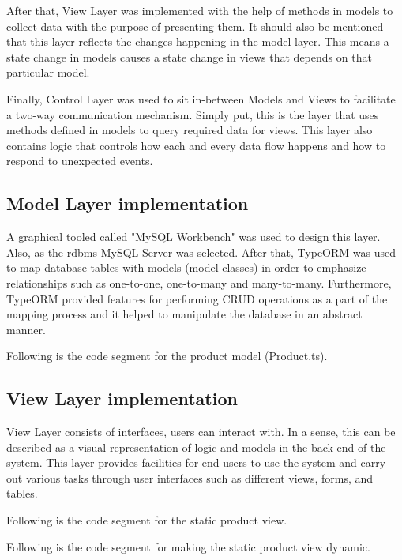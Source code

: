 \documentclass[12pt]{report}
\begin{document}
After that, View Layer was implemented with the help of methods in models to collect data with the purpose of presenting them. It should also be mentioned that this layer reflects the changes happening in the model layer. This means a state change in models causes a state change in views that depends on that particular model.

Finally, Control Layer was used to sit in-between Models and Views to facilitate a two-way communication mechanism. Simply put, this is the layer that uses methods defined in models to query required data for views. This layer also contains logic that controls how each and every data flow happens and how to respond to unexpected events.

\subsection{Model Layer implementation}
A graphical tooled called "MySQL Workbench" was used to design this layer. Also, as the \acrshort{rdbms} MySQL Server was selected. After that, TypeORM was used to map database tables with models (model classes) in order to emphasize relationships such as one-to-one, one-to-many and many-to-many. Furthermore, TypeORM provided features for performing CRUD operations as a part of the mapping process and it helped to manipulate the database in an abstract manner.

\noindent
Following is the code segment for the product model (Product.ts).



\subsection{View Layer implementation}
View Layer consists of interfaces, users can interact with. In a sense, this can be described as a visual representation of logic and models in the back-end of the system. This layer provides facilities for end-users to use the system and carry out various tasks through user interfaces such as different views, forms, and tables.

\noindent
Following is the code segment for the static product view.



\noindent
Following is the code segment for making the static product view dynamic.
\end{document}
